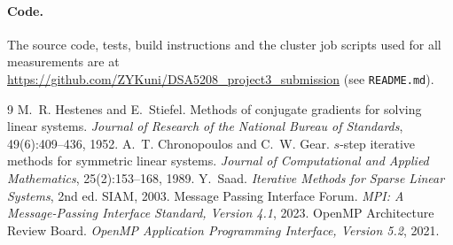 \documentclass[11pt,a4paper]{article}
\begin{document}
\paragraph{Code.} The source code, tests, build instructions and the cluster job scripts used for
all measurements are at \url{https://github.com/ZYKuni/DSA5208_project3_submission} (see \texttt{README.md}).

\begin{thebibliography}{9}\small
{} M.~R. Hestenes and E.~Stiefel. Methods of conjugate gradients for solving linear systems.
\emph{Journal of Research of the National Bureau of Standards}, 49(6):409--436, 1952.
 A.~T. Chronopoulos and C.~W. Gear. $s$-step iterative methods for symmetric linear systems.
\emph{Journal of Computational and Applied Mathematics}, 25(2):153--168, 1989.
 Y.~Saad. \emph{Iterative Methods for Sparse Linear Systems}, 2nd ed. SIAM, 2003.
 Message Passing Interface Forum. \emph{MPI: A Message-Passing Interface Standard, Version 4.1}, 2023.
 OpenMP Architecture Review Board. \emph{OpenMP Application Programming Interface, Version 5.2}, 2021.
\end{thebibliography}
\end{document}
